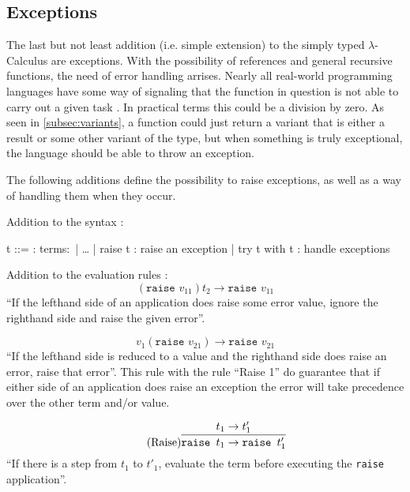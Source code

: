 \subsection{Exceptions}

The last but not least addition (i.e. simple extension) to the
simply typed $\lambda$-Calculus are exceptions. With the possibility
of references and general recursive functions, the need of
error handling arrises. Nearly all real-world programming languages
have some way of signaling that the function in question is not able
to carry out a given task \cite{pierce2002ProgLang}. In practical terms
this could be a division by zero. As seen in \ref{subsec:variants},
a function could just return a variant that is either a result or
some other variant of the type, but when something is truly exceptional,
the language should be able to throw an exception.

The following additions define the possibility to raise exceptions,
as well as a way of handling them when they occur.

Addition to the syntax \cite{pierce2002ProgLang}:
\begin{bnfgrammar}
    t ::= : terms$\colon$
    | \dots
    | raise t : raise an exception
    | try t with t : handle exceptions
\end{bnfgrammar}\leavevmode\newline

Addition to the evaluation rules \cite{pierce2002ProgLang}:
\begin{equation*}
    \tag{Application Raise 1}
    (\texttt{raise } v_{11}) t_2 \rightarrow \texttt{raise } v_{11}
\end{equation*}
``If the lefthand side of an application does raise some error value,
ignore the righthand side and raise the given error''.

\begin{equation*}
    \tag{Application Raise 2}
    v_1 (\texttt{raise } v_{21}) \rightarrow \texttt{raise } v_{21}
\end{equation*}
``If the lefthand side is reduced to a value and the righthand side does
raise an error, raise that error''. This rule with the rule ``Raise 1''
do guarantee that if either side of an application does raise an exception
the error will take precedence over the other term and/or value.

\begin{equation*}
    \tag{Raise}
    \infer{
        \texttt{raise } t_1 \rightarrow \texttt{raise } t'_1
    }{
        t_1 \rightarrow t'_1
    }
\end{equation*}
``If there is a step from $t_1$ to $t'_1$, evaluate the term
before executing the \texttt{raise} application''.

